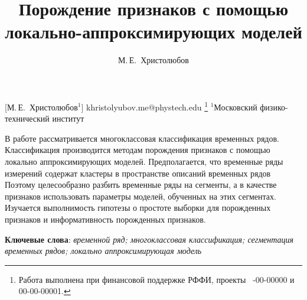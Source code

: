 \documentclass[12pt, twoside]{article}
\begin{document}
\title
    [Порождение признаков с помощью локально-аппроксимирующих моделей] %
    {Порождение признаков с помощью локально-аппроксимирующих моделей}
\author
    [М.\,Е.~Христолюбов] %
    {М.\,Е.~Христолюбов} %
    [М.\,Е.~Христолюбов$^1$] %
\email
    {khristolyubov.me@phystech.edu}
\thanks
    {Работа выполнена при
     финансовой поддержке РФФИ, проекты \No\ -00-00000 и 00-00-00001.}
\organization
    {$^1$Московский физико-технический институт}
\abstract
    {В работе рассматривается многоклассовая классификация временных рядов. Классификация производится методам порождения признаков с помощью локально аппроксимирующих моделей. Предполагается, что временные ряды измерений содержат кластеры в пространстве описаний временных рядов Поэтому целесообразно разбить временные ряды на сегменты, а в качестве признаков использовать параметры моделей, обученных на этих сегментах. Изучается выполнимость гипотезы о простоте выборки для порожденных признаков и информативность порожденных признаков.
	
\bigskip
\noindent
\textbf{Ключевые слова}: \emph {временной ряд; многоклассовая классификация; сегментация временных рядов; локально аппроксимирующая модель}
}
\end{document}
